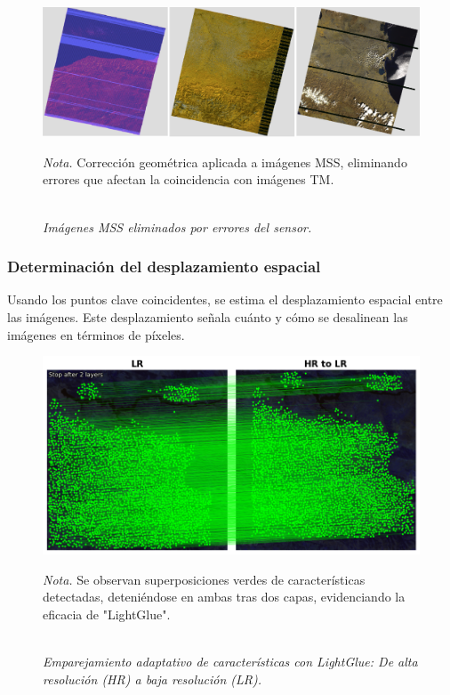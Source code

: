                 \begin{figure}[H] 
                    \caption{\doublespacing \\ \textit{Imágenes MSS eliminados por errores del sensor.}} 
                    \centering
                    \includegraphics[width=1\linewidth]{2_CAPITULO4/IMG/mss_errores.png}
                    \begin{justify}
                        \textit{Nota.} Corrección geométrica aplicada a imágenes MSS, eliminando errores que afectan la coincidencia con imágenes TM.
                    \end{justify}                    
                    \label{errores_mss}
                \end{figure}

            \subsubsection{Determinación del desplazamiento espacial}
                Usando los puntos clave coincidentes, se estima el desplazamiento espacial entre las imágenes. Este desplazamiento señala cuánto y cómo se desalinean las imágenes en términos de píxeles.

                \begin{figure}[H] 
                    \caption{\doublespacing \\ \textit{Emparejamiento adaptativo de características con LightGlue: De alta resolución (HR) a baja resolución (LR).}} 
                    \centering
                    \includegraphics[width=1\linewidth]{2_CAPITULO0/IMG/hr_to_lr.png}
                    \begin{justify}
                        \textit{Nota.} Se observan superposiciones verdes de características detectadas, deteniéndose en ambas tras dos capas, evidenciando la eficacia de "LightGlue".
                    \end{justify}                    
                    \label{hr_to_lr}
                \end{figure}
                
